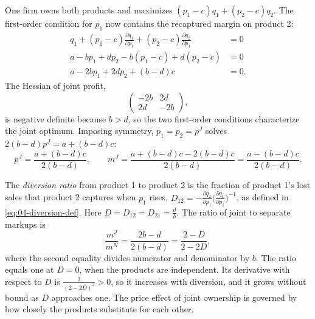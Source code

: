 \begin{example}
One firm owns both products and maximizes $(p_1 - c)q_1 + (p_2 - c)q_2$. The first-order condition for $p_1$ now
contains the recaptured margin on product 2:
\begin{align*}
q_1 + (p_1 - c)\frac{\partial q_1}{\partial p_1} + (p_2 - c)\frac{\partial q_2}{\partial p_1} &= 0 \\
a - bp_1 + dp_2 - b(p_1 - c) + d(p_2 - c) &= 0 \\
a - 2bp_1 + 2dp_2 + (b - d)c &= 0.
\end{align*}
The Hessian of joint profit,
\begin{equation*}
\begin{pmatrix}-2b & 2d\\ 2d & -2b\end{pmatrix},
\end{equation*}
is negative definite because $b > d$, so the two first-order conditions characterize the joint optimum. Imposing symmetry, $p_1 = p_2 = p^J$
solves $2(b - d)p^J = a + (b - d)c$:
\begin{equation*}
p^J = \frac{a + (b - d)c}{2(b - d)},
\qquad
m^J = \frac{a + (b - d)c - 2(b - d)c}{2(b - d)} = \frac{a - (b - d)c}{2(b - d)}.
\end{equation*}

The \emph{diversion ratio} from product 1 to product 2 is the fraction of product 1's lost sales that product 2
captures when $p_1$ rises,
$D_{12} = -\frac{\partial q_2}{\partial p_1}\big(\frac{\partial q_1}{\partial p_1}\big)^{-1}$, as defined in
\eqref{eq:04-diversion-def}. Here $D = D_{12} = D_{21} = \frac{d}{b}$. The ratio of joint to separate markups is
\begin{equation*}
\frac{m^J}{m^N} = \frac{2b - d}{2(b - d)} = \frac{2 - D}{2 - 2D},
\end{equation*}
where the second equality divides numerator and denominator by $b$. The ratio equals one at $D = 0$, when the
products are independent. Its derivative with respect to $D$ is $\frac{2}{(2 - 2D)^2} > 0$, so it increases with
diversion, and it grows without bound as $D$ approaches one. The price effect of joint ownership is governed by
how closely the products substitute for each other.


\end{example}
